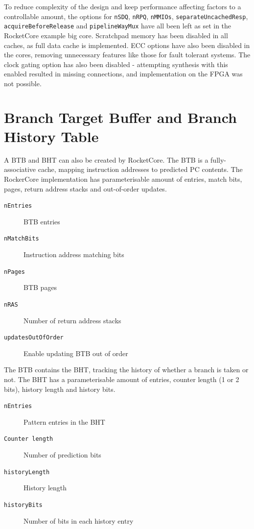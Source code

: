 To reduce complexity of the design and keep performance affecting factors to a controllable amount, the options for \texttt{nSDQ}, \texttt{nRPQ}, \texttt{nMMIOs}, \texttt{separateUncachedResp}, \texttt{acquireBeforeRelease} and \texttt{pipelineWayMux} have all been left as set in the RocketCore example big core. Scratchpad memory has been disabled in all caches, as full data cache is implemented. ECC options have also been disabled in the cores, removing unnecessary features like those for fault tolerant systems. The clock gating option has also been disabled - attempting synthesis with this enabled resulted in missing connections, and implementation on the FPGA was not possible.

\section{Branch Target Buffer and Branch History Table}
A BTB and BHT can also be created by RocketCore. The BTB is a fully-associative cache, mapping instruction addresses to predicted PC contents. The RockerCore implementation has parameterisable amount of entries, match bits, pages, return address stacks and out-of-order updates.

\begin{description}
    \item[\texttt{nEntries}] BTB entries
    \item[\texttt{nMatchBits}] Instruction address matching bits
    \item[\texttt{nPages}] BTB pages
    \item[\texttt{nRAS}] Number of return address stacks
    \item[\texttt{updatesOutOfOrder}] Enable updating BTB out of order
\end{description}

The BTB contains the BHT, tracking the history of whether a branch is taken or not. The BHT has a parameterisable amount of entries, counter length (1 or 2 bits), history length and history bits.

\begin{description}
    \item[\texttt{nEntries}] Pattern entries in the BHT
    \item[\texttt{Counter length}] Number of prediction bits
    \item[\texttt{historyLength}] History length
    \item[\texttt{historyBits}] Number of bits in each history entry
\end{description}

